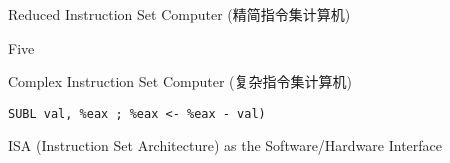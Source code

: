 

\begin{frame}{}
  \begin{center}
     Reduced Instruction Set Computer (精简指令集计算机)

    \vspace{0.80cm}
    \vspace{0.80cm}

     Five
  \end{center}
\end{frame}

\begin{frame}{}
  \begin{center}
     Complex Instruction Set Computer (复杂指令集计算机)

    \vspace{0.30cm}
    \vspace{0.30cm}

  \end{center}
\end{frame}

\begin{frame}{}
  \begin{center}
     \texttt{SUBL val, \%eax ; \%eax <- \%eax - val)}

    \vspace{0.30cm}
    \vspace{0.30cm}
  \end{center}
\end{frame}

\begin{frame}{}
  \begin{center}
    ISA (Instruction Set Architecture) as the Software/Hardware Interface

    \pause
  \end{center}
\end{frame}

